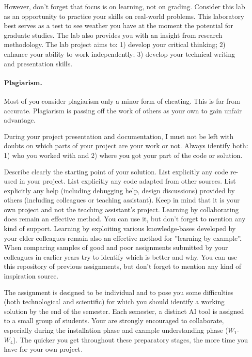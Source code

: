 However, don't forget that focus is on learning, not on grading.
Consider this lab as an opportunity to practice your skills on real-world problems. 
This laboratory best serves as a test to see weather you have at the moment the potential for graduate studies. 
The lab also provides you with an insight from research methodology.  
The lab project aims to: 
1) develop your critical thinking;
2) enhance your ability to work independently;
3) develop your technical writing and presentation skills.



\paragraph{Plagiarism.} Most of you consider plagiarism only a minor form of cheating.
This is far from accurate. 
Plagiarism is passing off the work of others as your own to gain unfair advantage. 

During your project presentation and documentation, 
I must not be left with doubts on which parts of your project are your work or not.  
Always identify both: 
1) who you worked with and 
2) where you got your part of the code or solution.

Describe clearly the starting point of your solution.
List explicitly any code re-used in your project. 
List explicitly any code adapted from other sources.
List explicitly any help (including debugging help, design discussions) provided by others (including colleagues or teaching assistant). 
Keep in mind that it is your own project and not the teaching assistant's project. 
Learning by collaborating does remain an effective method. 
You can use it, but don't forget to mention any kind of support. 
Learning by exploiting various knowledge-bases developed by your elder colleagues remain also an effective method for ''learning by example''. 
When comparing samples of good and poor assignments submitted by your colleagues in earlier years try to identify which is better and why. 
You can use this repository of previous assignments, but don't forget to mention any kind of inspiration source. 

The assignment is designed to be individual and to pose you some difficulties 
(both technological and scientific) for which you should identify a working solution by the end of the semester.  
Each semester, a distinct AI tool is assigned to a small group of students. 
Your are strongly encouraged to collaborate, especially during the installation phase and example understanding phase ($W_1$-$W_4$). 
The quicker you get throughout these preparatory stages, the more time you have for your own project.


